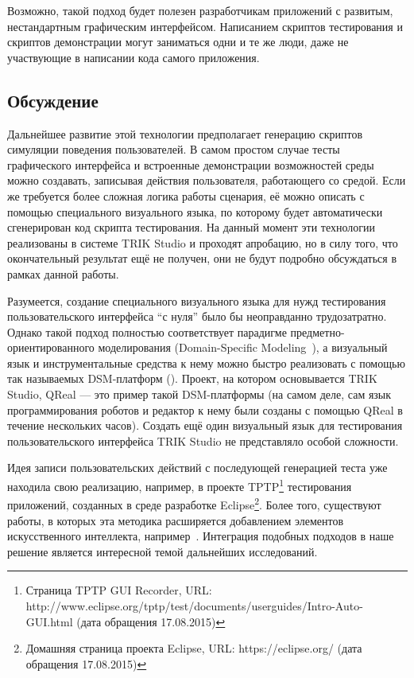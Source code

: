 \documentclass[conference]{IEEEtran}
\begin{document}
Возможно, такой подход будет полезен разработчикам приложений с развитым, нестандартным графическим интерфейсом. 
Написанием скриптов тестирования и скриптов демонстрации могут заниматься одни и те же люди, даже не участвующие 
в написании кода самого приложения.

\subsection{Обсуждение}
Дальнейшее развитие этой технологии предполагает генерацию скриптов симуляции поведения пользователей. В самом 
простом случае тесты графического интерфейса и встроенные демонстрации возможностей среды можно создавать, 
записывая действия пользователя, работающего со средой. Если же требуется более сложная логика работы сценария, 
её можно описать с помощью специального визуального языка, по которому будет автоматически сгенерирован код 
скрипта тестирования. На данный момент эти технологии реализованы в системе TRIK Studio и проходят апробацию, 
но в силу того, что окончательный результат ещё не получен, они не будут подробно обсуждаться в рамках данной работы.

Разумеется, создание специального визуального языка для нужд тестирования пользовательского интерфейса "`с нуля"' 
было бы неоправданно трудозатратно. Однако такой подход полностью соответствует парадигме предметно-ориентированного 
моделирования (Domain-Specific Modeling~\cite{mernik2005and}), а визуальный язык и инструментальные средства 
к нему можно быстро реализовать с помощью так называемых DSM-платформ (\cite{pavlinov2006dsmtools, kelly2008domain}). 
Проект, на котором основывается TRIK Studio, QReal --- это пример такой DSM-платформы (на самом деле, 
сам язык программирования роботов и редактор к нему были созданы с помощью QReal в течение нескольких часов). 
Создать ещё один визуальный язык для тестирования пользовательского интерфейса TRIK Studio не представляло особой сложности.

Идея записи пользовательских действий с последующей генерацией теста уже находила свою реализацию, например, 
в проекте TPTP\footnote{Страница TPTP GUI Recorder, URL: http://www.eclipse.org/tptp/test/documents/userguides/Intro-Auto-GUI.html (дата обращения 17.08.2015)} 
тестирования приложений, созданных в среде разработке Eclipse\footnote{Домашняя страница проекта Eclipse, URL: https://eclipse.org/ (дата обращения 17.08.2015)}. 
Более того, существуют работы, в которых эта методика расширяется добавлением элементов искусственного 
интеллекта, например~\cite{memon2001hierarchical, sugiura1996simplifying}. Интеграция подобных подходов в наше решение 
является интересной темой дальнейших исследований.
\end{document}
